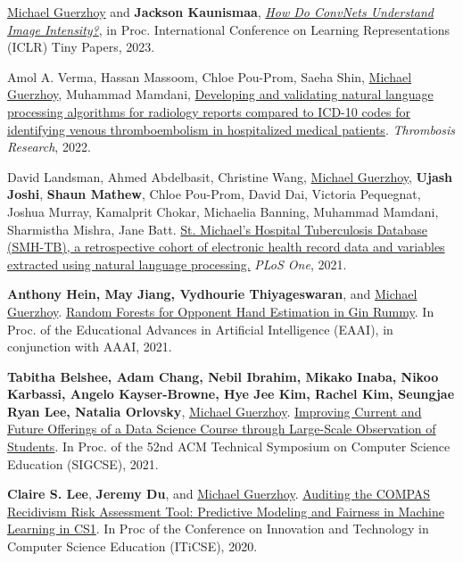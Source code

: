 \documentclass[letterpaper,11pt]{article}
\begin{document}
\begin{revnumerate}
\item \underline{Michael Guerzhoy} and \textbf{Jackson Kaunismaa}, \href{https://openreview.net/forum?id=z2Gr8YqsimF}{\textit{How Do ConvNets Understand Image Intensity?}}, in Proc. International Conference on Learning Representations (ICLR) Tiny Papers, 2023.


\item Amol A. Verma, Hassan Massoom, Chloe Pou-Prom, Saeha Shin, \underline{Michael Guerzhoy}, Muhammad Mamdani, \href{https://www.sciencedirect.com/science/article/abs/pii/S0049384821005296}{Developing and validating natural language processing algorithms for radiology reports compared to ICD-10 codes for identifying venous thromboembolism in hospitalized medical patients}. \textit{Thrombosis Research}, 2022.

\item  David Landsman, Ahmed Abdelbasit, Christine Wang, \underline{Michael Guerzhoy}, \textbf{Ujash Joshi}, \textbf{Shaun Mathew}, Chloe Pou-Prom, David Dai, Victoria Pequegnat, Joshua Murray, Kamalprit Chokar, Michaelia Banning, Muhammad Mamdani, Sharmistha Mishra,  Jane Batt. \href{https://journals.plos.org/plosone/article?id=10.1371/journal.pone.0247872}{St. Michael’s Hospital Tuberculosis Database (SMH-TB), a retrospective cohort of electronic health record data and variables extracted using natural language processing.} \textit{PLoS One}, 2021.



\item \textbf{Anthony Hein, May Jiang, Vydhourie Thiyageswaran}, and \underline{Michael Guerzhoy}. \href{https://ojs.aaai.org/index.php/AAAI/article/view/17830}{\href{https://doi.org/10.1609/aaai.v35i17.17830}{Random Forests for Opponent Hand Estimation in Gin Rummy}}. In Proc. of the Educational Advances in Artificial Intelligence (EAAI), in conjunction with AAAI,  2021.

\item \textbf{Tabitha Belshee, Adam Chang, Nebil Ibrahim, Mikako Inaba, Nikoo Karbassi, Angelo Kayser-Browne, Hye Jee Kim, Rachel Kim, Seungjae Ryan Lee, Natalia Orlovsky}, \underline{Michael Guerzhoy}. \href{935-Belshee.pdf}{\href{https://doi.org/10.1145/3408877.3439640}{Improving Current and Future Offerings of a Data Science Course through Large-Scale Observation of Students}}. In Proc. of the 52nd  ACM Technical Symposium on Computer Science Education (SIGCSE), 2021.


\item \textbf{Claire S. Lee}, \textbf{Jeremy Du}, and \underline{Michael Guerzhoy}. \href{https://predictivemodellingearly.github.io/}{\href{https://doi.org/10.1145/3341525.3393998}{Auditing the COMPAS Recidivism Risk Assessment Tool: Predictive Modeling and Fairness in Machine Learning in CS1}}. In Proc of the Conference on	Innovation and Technology in Computer Science Education (ITiCSE), 2020. 




\end{revnumerate}
\end{document}
